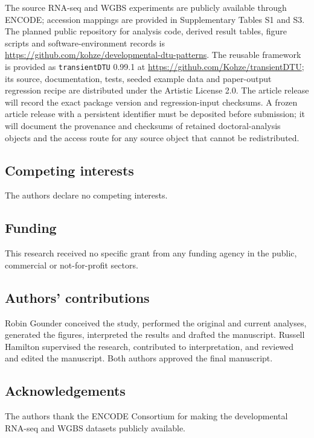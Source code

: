 \documentclass[11pt,a4paper]{article}
\begin{document}
The source RNA-seq and WGBS experiments are publicly available through ENCODE; accession mappings are provided in Supplementary Tables S1 and S3. The planned public repository for analysis code, derived result tables, figure scripts and software-environment records is \url{https://github.com/kohze/developmental-dtu-patterns}. The reusable framework is provided as \texttt{transientDTU} 0.99.1 at \url{https://github.com/Kohze/transientDTU}; its source, documentation, tests, seeded example data and paper-output regression recipe are distributed under the Artistic License 2.0. The article release will record the exact package version and regression-input checksums. A frozen article release with a persistent identifier must be deposited before submission; it will document the provenance and checksums of retained doctoral-analysis objects and the access route for any source object that cannot be redistributed.

\subsection*{Competing interests}

The authors declare no competing interests.

\subsection*{Funding}

This research received no specific grant from any funding agency in the public, commercial or not-for-profit sectors.

\subsection*{Authors' contributions}

Robin Gounder conceived the study, performed the original and current analyses, generated the figures, interpreted the results and drafted the manuscript. Russell Hamilton supervised the research, contributed to interpretation, and reviewed and edited the manuscript. Both authors approved the final manuscript.

\subsection*{Acknowledgements}

The authors thank the ENCODE Consortium for making the developmental RNA-seq and WGBS datasets publicly available.
\end{document}
